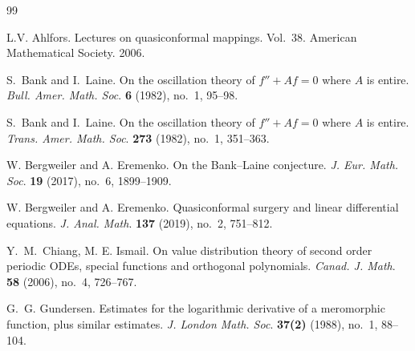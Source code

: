 \documentclass[12pt]{amsart}
\numberwithin{equation}{section}
\begin{document}


\begin{thebibliography}{99}

L.V. Ahlfors. Lectures on quasiconformal mappings. Vol.~38. American Mathematical Society. 2006.

S.~Bank and I.~Laine. On the oscillation theory of $f''+Af=0$ where $A$ is entire. {\it Bull. Amer. Math. Soc}. {\bf 6} (1982), no.~1, 95--98.

S.~Bank and I.~Laine. On the oscillation theory of $f''+Af=0$ where $A$ is entire. {\it Trans. Amer. Math. Soc}. {\bf 273} (1982), no.~1, 351--363.


W. Bergweiler and A. Eremenko. On the Bank--Laine conjecture. {\it J. Eur. Math. Soc}. {\bf 19} (2017), no.~6, 1899--1909.

W. Bergweiler and A. Eremenko. Quasiconformal surgery and linear differential equations. {\it J. Anal. Math}. {\bf 137} (2019), no.~2, 751--812.

Y.~M.~Chiang, M. E. Ismail. On value distribution theory of second order periodic ODEs, special functions and orthogonal polynomials. {\it Canad. J. Math}. {\bf 58} (2006), no.~4, 726--767.

G.~G. Gundersen. Estimates for the logarithmic derivative of a meromorphic function, plus similar estimates. {\it J. London Math. Soc}. {\bf 37(2)} (1988), no.~1, 88--104.


\end{thebibliography}
\end{document}
